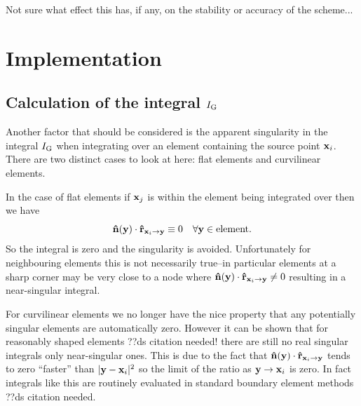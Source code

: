 Not sure what effect this has, if any, on the stability or accuracy of the scheme...

\section{Implementation}

\subsection{Calculation of the integral $I_{\mathbf{\mathrm{G}}}$}
Another factor that should be considered is the apparent singularity in the integral $I_{\mathbf{\mathrm{G}}}$ when integrating over an element containing the source point $\mathbf{x}_{i}$. There are two distinct cases to look at here: flat elements and curvilinear elements.

In the case of flat elements if $\mathbf{x}_{j}$ is within the element being integrated over then we have
\begin{equation}
  \label{eq:7}
  \mathbf{\hat{n}}(\mathbf{y}) \cdot \mathbf{\hat{r}}_{\mathbf{x}_{{i}} \rightarrow \mathbf{y}} \equiv 0 \quad \forall \mathbf{y} \in \text{element}.
\end{equation}
So the integral is zero and the singularity is avoided. Unfortunately for neighbouring elements this is not necessarily true--in particular elements at a sharp corner may be very close to a node where $\mathbf{\hat{n}}(\mathbf{y}) \cdot \mathbf{\hat{r}}_{\mathbf{x}_{{i}} \rightarrow \mathbf{y}} \neq 0$ resulting in a near-singular integral.

For curvilinear elements we no longer have the nice property that any potentially singular elements are automatically zero. However it can be shown that for reasonably shaped elements ??ds citation needed! there are still no real singular integrals only near-singular ones. This is due to the fact that $\mathbf{\hat{n}}(\mathbf{y}) \cdot \mathbf{\hat{r}}_{\mathbf{x}_{{i}} \rightarrow \mathbf{y}}$ tends to zero ``faster'' than $\lvert \mathbf{y} - \mathbf{x}_{i} \rvert^2$ so the limit of the ratio as $\mathbf{y} \rightarrow \mathbf{x}_{i}$ is zero. In fact integrals like this are routinely evaluated in standard boundary element methods ??ds citation needed.





